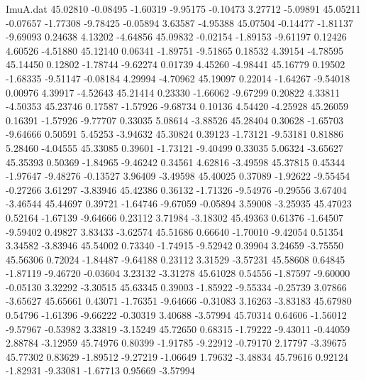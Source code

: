 \begin{filecontents}{ImuA.dat}
  45.02810   -0.08495   -1.60319   -9.95175   -0.10473    3.27712   -5.09891
  45.05211   -0.07657   -1.77308   -9.78425   -0.05894    3.63587   -4.95388
  45.07504   -0.14477   -1.81137   -9.69093    0.24638    4.13202   -4.64856
  45.09832   -0.02154   -1.89153   -9.61197    0.12426    4.60526   -4.51880
  45.12140    0.06341   -1.89751   -9.51865    0.18532    4.39154   -4.78595
  45.14450    0.12802   -1.78744   -9.62274    0.01739    4.45260   -4.98441
  45.16779    0.19502   -1.68335   -9.51147   -0.08184    4.29994   -4.70962
  45.19097    0.22014   -1.64267   -9.54018    0.00976    4.39917   -4.52643
  45.21414    0.23330   -1.66062   -9.67299    0.20822    4.33811   -4.50353
  45.23746    0.17587   -1.57926   -9.68734    0.10136    4.54420   -4.25928
  45.26059    0.16391   -1.57926   -9.77707    0.33035    5.08614   -3.88526
  45.28404    0.30628   -1.65703   -9.64666    0.50591    5.45253   -3.94632
  45.30824    0.39123   -1.73121   -9.53181    0.81886    5.28460   -4.04555
  45.33085    0.39601   -1.73121   -9.40499    0.33035    5.06324   -3.65627
  45.35393    0.50369   -1.84965   -9.46242    0.34561    4.62816   -3.49598
  45.37815    0.45344   -1.97647   -9.48276   -0.13527    3.96409   -3.49598
  45.40025    0.37089   -1.92622   -9.55454   -0.27266    3.61297   -3.83946
  45.42386    0.36132   -1.71326   -9.54976   -0.29556    3.67404   -3.46544
  45.44697    0.39721   -1.64746   -9.67059   -0.05894    3.59008   -3.25935
  45.47023    0.52164   -1.67139   -9.64666    0.23112    3.71984   -3.18302
  45.49363    0.61376   -1.64507   -9.59402    0.49827    3.83433   -3.62574
  45.51686    0.66640   -1.70010   -9.42054    0.51354    3.34582   -3.83946
  45.54002    0.73340   -1.74915   -9.52942    0.39904    3.24659   -3.75550
  45.56306    0.72024   -1.84487   -9.64188    0.23112    3.31529   -3.57231
  45.58608    0.64845   -1.87119   -9.46720   -0.03604    3.23132   -3.31278
  45.61028    0.54556   -1.87597   -9.60000   -0.05130    3.32292   -3.30515
  45.63345    0.39003   -1.85922   -9.55334   -0.25739    3.07866   -3.65627
  45.65661    0.43071   -1.76351   -9.64666   -0.31083    3.16263   -3.83183
  45.67980    0.54796   -1.61396   -9.66222   -0.30319    3.40688   -3.57994
  45.70314    0.64606   -1.56012   -9.57967   -0.53982    3.33819   -3.15249
  45.72650    0.68315   -1.79222   -9.43011   -0.44059    2.88784   -3.12959
  45.74976    0.80399   -1.91785   -9.22912   -0.79170    2.17797   -3.39675
  45.77302    0.83629   -1.89512   -9.27219   -1.06649    1.79632   -3.48834
  45.79616    0.92124   -1.82931   -9.33081   -1.67713    0.95669   -3.57994

\end{filecontents}
